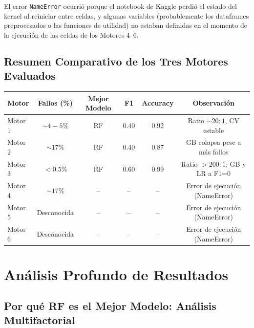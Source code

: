 \documentclass[12pt,a4paper]{article}
\begin{document}
El error \texttt{NameError} ocurri\'{o} porque el notebook de Kaggle perdi\'{o} el estado
del kernel al reiniciar entre celdas, y algunas variables (probablemente los dataframes
preprocesados o las funciones de utilidad) no estaban definidas en el momento de la
ejecuci\'{o}n de las celdas de los Motores 4--6.

\subsection{Resumen Comparativo de los Tres Motores Evaluados}

\begin{center}
\begin{tabular}{lccccc}
\toprule
\textbf{Motor} & \textbf{Fallos (\%)} & \textbf{Mejor Modelo} & \textbf{F1} & \textbf{Accuracy} & \textbf{Observaci\'{o}n} \\
\midrule
Motor 1 & $\sim 4{-}5\%$  & RF & 0.40 & 0.92 & Ratio $\sim 20:1$, CV estable \\
Motor 2 & $\sim 17\%$     & RF & 0.40 & 0.87 & GB colapsa pese a m\'{a}s fallos \\
Motor 3 & $< 0.5\%$       & RF & 0.60 & 0.99 & Ratio $>200:1$; GB y LR a F1=0 \\
Motor 4 & $\sim 17\%$     & --  & --   & --   & Error de ejecuci\'{o}n (NameError) \\
Motor 5 & Desconocida     & --  & --   & --   & Error de ejecuci\'{o}n (NameError) \\
Motor 6 & Desconocida     & --  & --   & --   & Error de ejecuci\'{o}n (NameError) \\
\bottomrule
\end{tabular}
\end{center}

\section{An\'{a}lisis Profundo de Resultados}

\subsection{Por qu\'{e} RF es el Mejor Modelo: An\'{a}lisis Multifactorial}
\end{document}
